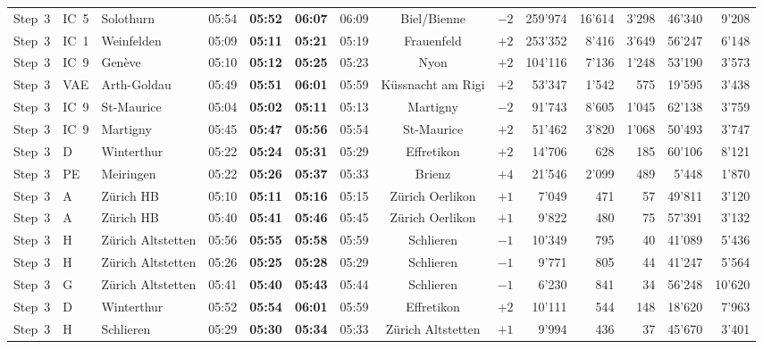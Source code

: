 \documentclass[preprint,12pt]{elsarticle}
\begin{document}
\begin{table}[!htb]
{\begin{tabular}{lllcccccrrrrrr}
\midrule
Step~3 & IC~5 & Solothurn & 05:54 & \textbf{05:52} & \textbf{06:07} & 06:09 & Biel/Bienne & \(-2\) & 259'974 & 16'614 & 3'298 & 46'340 & 9'208 \\
Step~3 & IC~1 & Weinfelden & 05:09 & \textbf{05:11} & \textbf{05:21} & 05:19 & Frauenfeld & \(+2\) & 253'352 & 8'416 & 3'649 & 56'247 & 6'148 \\
Step~3 & IC~9 & Genève & 05:10 & \textbf{05:12} & \textbf{05:25} & 05:23 & Nyon & \(+2\) & 104'116 & 7'136 & 1'248 & 53'190 & 3'573 \\
Step~3 & VAE & Arth-Goldau & 05:49 & \textbf{05:51} & \textbf{06:01} & 05:59 & Küssnacht am Rigi & \(+2\) & 53'347 & 1'542 & 575 & 19'595 & 3'438 \\
Step~3 & IC~9 & St-Maurice & 05:04 & \textbf{05:02} & \textbf{05:11} & 05:13 & Martigny & \(-2\) & 91'743 & 8'605 & 1'045 & 62'138 & 3'759 \\
Step~3 & IC~9 & Martigny & 05:45 & \textbf{05:47} & \textbf{05:56} & 05:54 & St-Maurice & \(+2\) & 51'462 & 3'820 & 1'068 & 50'493 & 3'747 \\
Step~3 & D & Winterthur & 05:22 & \textbf{05:24} & \textbf{05:31} & 05:29 & Effretikon & \(+2\) & 14'706 & 628 & 185 & 60'106 & 8'121 \\
Step~3 & PE & Meiringen & 05:22 & \textbf{05:26} & \textbf{05:37} & 05:33 & Brienz & \(+4\) & 21'546 & 2'099 & 489 & 5'448 & 1'870 \\
Step~3 & A & Zürich HB & 05:10 & \textbf{05:11} & \textbf{05:16} & 05:15 & Zürich Oerlikon & \(+1\) & 7'049 & 471 & 57 & 49'811 & 3'120 \\
Step~3 & A & Zürich HB & 05:40 & \textbf{05:41} & \textbf{05:46} & 05:45 & Zürich Oerlikon & \(+1\) & 9'822 & 480 & 75 & 57'391 & 3'132 \\
Step~3 & H & Zürich Altstetten & 05:56 & \textbf{05:55} & \textbf{05:58} & 05:59 & Schlieren & \(-1\) & 10'349 & 795 & 40 & 41'089 & 5'436 \\
Step~3 & H & Zürich Altstetten & 05:26 & \textbf{05:25} & \textbf{05:28} & 05:29 & Schlieren & \(-1\) & 9'771 & 805 & 44 & 41'247 & 5'564 \\
Step~3 & G & Zürich Altstetten & 05:41 & \textbf{05:40} & \textbf{05:43} & 05:44 & Schlieren & \(-1\) & 6'230 & 841 & 34 & 56'248 & 10'620 \\
Step~3 & D & Winterthur & 05:52 & \textbf{05:54} & \textbf{06:01} & 05:59 & Effretikon & \(+2\) & 10'111 & 544 & 148 & 18'620 & 7'963 \\
Step~3 & H & Schlieren & 05:29 & \textbf{05:30} & \textbf{05:34} & 05:33 & Zürich Altstetten & \(+1\) & 9'994 & 436 & 37 & 45'670 & 3'401 \\

\end{tabular}}
\end{table}
\end{document}
